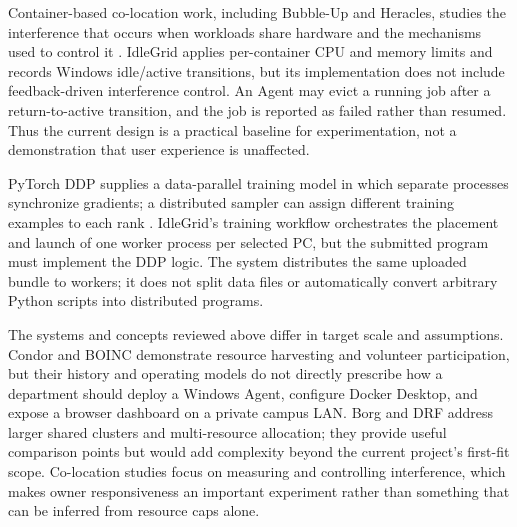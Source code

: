 \documentclass{article}
\begin{document}
Container-based co-location work, including Bubble-Up and Heracles, studies the interference that occurs when workloads share hardware and the mechanisms used to control it \cite{bubbleup,heracles}. IdleGrid applies per-container CPU and memory limits and records Windows idle/active transitions, but its implementation does not include feedback-driven interference control. An Agent may evict a running job after a return-to-active transition, and the job is reported as failed rather than resumed. Thus the current design is a practical baseline for experimentation, not a demonstration that user experience is unaffected.

PyTorch DDP supplies a data-parallel training model in which separate processes synchronize gradients; a distributed sampler can assign different training examples to each rank \cite{pytorchddp}. IdleGrid's training workflow orchestrates the placement and launch of one worker process per selected PC, but the submitted program must implement the DDP logic. The system distributes the same uploaded bundle to workers; it does not split data files or automatically convert arbitrary Python scripts into distributed programs.

The systems and concepts reviewed above differ in target scale and assumptions. Condor and BOINC demonstrate resource harvesting and volunteer participation, but their history and operating models do not directly prescribe how a department should deploy a Windows Agent, configure Docker Desktop, and expose a browser dashboard on a private campus LAN. Borg and DRF address larger shared clusters and multi-resource allocation; they provide useful comparison points but would add complexity beyond the current project's first-fit scope. Co-location studies focus on measuring and controlling interference, which makes owner responsiveness an important experiment rather than something that can be inferred from resource caps alone.
\end{document}
